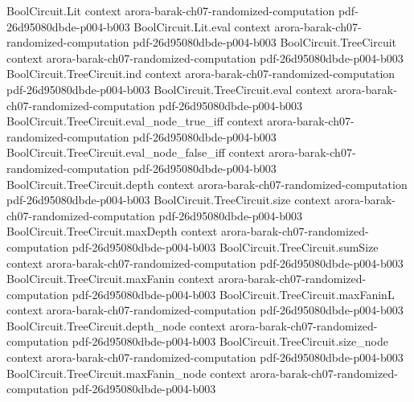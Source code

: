 \begin{theorem}
\label{Randomized.PITLang_mem_BPP_PTM}
\leanok
{}
\proofstep
  {BoolCircuit.Lit}
  {context}
  {arora-barak-ch07-randomized-computation}
  {pdf-26d95080dbde-p004-b003}
\proofstep
  {BoolCircuit.Lit.eval}
  {context}
  {arora-barak-ch07-randomized-computation}
  {pdf-26d95080dbde-p004-b003}
\proofstep
  {BoolCircuit.TreeCircuit}
  {context}
  {arora-barak-ch07-randomized-computation}
  {pdf-26d95080dbde-p004-b003}
\proofstep
  {BoolCircuit.TreeCircuit.ind}
  {context}
  {arora-barak-ch07-randomized-computation}
  {pdf-26d95080dbde-p004-b003}
\proofstep
  {BoolCircuit.TreeCircuit.eval}
  {context}
  {arora-barak-ch07-randomized-computation}
  {pdf-26d95080dbde-p004-b003}
\proofstep
  {BoolCircuit.TreeCircuit.eval_node_true_iff}
  {context}
  {arora-barak-ch07-randomized-computation}
  {pdf-26d95080dbde-p004-b003}
\proofstep
  {BoolCircuit.TreeCircuit.eval_node_false_iff}
  {context}
  {arora-barak-ch07-randomized-computation}
  {pdf-26d95080dbde-p004-b003}
\proofstep
  {BoolCircuit.TreeCircuit.depth}
  {context}
  {arora-barak-ch07-randomized-computation}
  {pdf-26d95080dbde-p004-b003}
\proofstep
  {BoolCircuit.TreeCircuit.size}
  {context}
  {arora-barak-ch07-randomized-computation}
  {pdf-26d95080dbde-p004-b003}
\proofstep
  {BoolCircuit.TreeCircuit.maxDepth}
  {context}
  {arora-barak-ch07-randomized-computation}
  {pdf-26d95080dbde-p004-b003}
\proofstep
  {BoolCircuit.TreeCircuit.sumSize}
  {context}
  {arora-barak-ch07-randomized-computation}
  {pdf-26d95080dbde-p004-b003}
\proofstep
  {BoolCircuit.TreeCircuit.maxFanin}
  {context}
  {arora-barak-ch07-randomized-computation}
  {pdf-26d95080dbde-p004-b003}
\proofstep
  {BoolCircuit.TreeCircuit.maxFaninL}
  {context}
  {arora-barak-ch07-randomized-computation}
  {pdf-26d95080dbde-p004-b003}
\proofstep
  {BoolCircuit.TreeCircuit.depth_node}
  {context}
  {arora-barak-ch07-randomized-computation}
  {pdf-26d95080dbde-p004-b003}
\proofstep
  {BoolCircuit.TreeCircuit.size_node}
  {context}
  {arora-barak-ch07-randomized-computation}
  {pdf-26d95080dbde-p004-b003}
\proofstep
  {BoolCircuit.TreeCircuit.maxFanin_node}
  {context}
  {arora-barak-ch07-randomized-computation}
  {pdf-26d95080dbde-p004-b003}

\end{theorem}
